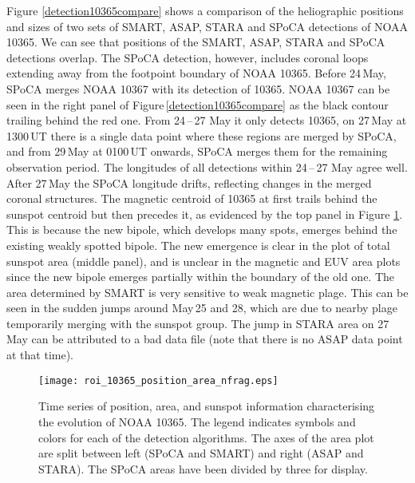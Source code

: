 {Figure \ref{detection10365compare} shows a comparison of the heliographic
positions and sizes of two sets of \gls{SMART}, \gls{ASAP}, \gls{STARA} and \gls{SPoCA} detections of NOAA 10365. We can see that positions of the \gls{SMART}, \gls{ASAP}, \gls{STARA} and \gls{SPoCA} detections overlap. The \gls{SPoCA} detection, however, includes coronal loops extending away from the footpoint boundary of NOAA 10365.
Before 24\,May, \gls{SPoCA} merges NOAA 10367 with its detection of 10365. NOAA 10367 can be seen in the right panel of Figure\,\ref{detection10365compare} as the black contour trailing behind the red one. From 24\,--\,27 May it only detects 10365, on 27\,May at 1300\,UT there is a single data point where these regions are merged by \gls{SPoCA}, and from 29\,May at 0100\,UT onwards, \gls{SPoCA} merges them for the remaining observation period. The longitudes of all detections within 24\,--\,27 May agree well. After 27\,May the \gls{SPoCA} longitude drifts, reflecting changes in the merged coronal structures.
The magnetic centroid of 10365 at first trails behind the sunspot
centroid but then precedes it, as evidenced by the top panel in Figure
\ref{10365evolve_area_pos_num}. This is because the new bipole, which develops
many spots, emerges behind the existing weakly spotted bipole. The new emergence
is clear in the plot of total sunspot area (middle panel), and is unclear in the
magnetic and \gls{EUV} area plots since the new bipole emerges partially within the
boundary of the old one. The area determined by \gls{SMART} is very sensitive to weak
magnetic plage. This can be seen in the sudden jumps around May\,25 and
28, which are due to nearby plage temporarily merging with the sunspot group.   
The jump in \gls{STARA} area on 27\,May can be attributed to a bad data file (note that there is no \gls{ASAP} data point at that time).

\begin{figure}[!t]
\centerline{\texttt{[image: roi\_10365\_position\_area\_nfrag.eps]}}
\caption[NOAA 10365 property evolution.]{Time series of position, area, and sunspot information characterising
the evolution of NOAA 10365. The legend indicates symbols and colors for each
of the detection algorithms. The axes of the area plot are split between left
(SPoCA and SMART) and right (ASAP and STARA). The SPoCA areas have been divided
by three for display.}
\label{10365evolve_area_pos_num}
\end{figure}

}
